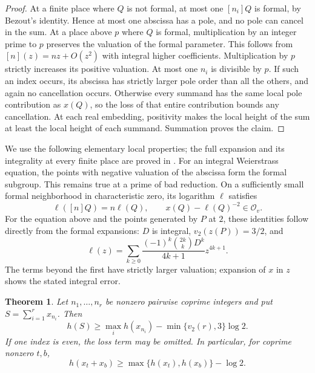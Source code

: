 \documentclass[11pt]{article}
\newtheorem{theorem}{Theorem}[section]
\theoremstyle{remark}\newtheorem{remark}[theorem]{Remark}
\begin{document}
\begin{proof}
At a finite place where $Q$ is not formal, at most one $[n_i]Q$ is
formal, by Bezout's identity.  Hence at most one abscissa has a pole,
and no pole can cancel in the sum.
At a place above $p$ where $Q$ is formal, multiplication by an integer
prime to $p$ preserves the valuation of the formal parameter.  This
follows from $[n](z)=nz+O(z^2)$ with integral higher coefficients.
Multiplication by $p$ strictly increases its positive valuation.
At most one $n_i$ is divisible by $p$.  If such an index occurs, its
abscissa has strictly larger pole order than all the others, and
again no cancellation occurs.  Otherwise every summand has the same
local pole contribution as $x(Q)$, so the loss of that entire
contribution bounds any cancellation.  At each real embedding,
positivity makes the local height of the sum at least the local
height of each summand.  Summation proves the claim.
\end{proof}

We use the following elementary local properties; the full expansion
and its integrality at every finite place are proved in
\cite[Lemma~2]{EffectiveSums}.  For an integral
Weierstrass equation, the points with negative valuation of the
abscissa form the formal subgroup.  This remains true at a prime of bad
reduction.  On a sufficiently small formal neighborhood in characteristic
zero, its logarithm $\ell$ satisfies
\[
\ell([n]Q)=n\ell(Q),\qquad x(Q)-\ell(Q)^{-2}\in\mathcal O_v.
\]
For the equation above and the points generated by $P$ at $2$, these
identities follow directly from the formal expansions: $D$ is integral,
$v_2(z(P))=3/2$, and
\[
\ell(z)=\sum_{k\ge0}
 \frac{(-1)^k\binom{2k}{k}D^k}{4k+1}z^{4k+1}.
\]
The terms beyond the first have strictly larger valuation; expansion
of $x$ in $z$ shows the stated integral error.

\begin{theorem}\label{thm:coprime}
Let $n_1,\ldots,n_r$ be nonzero pairwise coprime integers and put
$S=\sum_{i=1}^r x_{n_i}$.  Then
\begin{equation}\label{eq:height}
h(S)\ge\max_i h(x_{n_i})-\min\{v_2(r),3\}\log2.
\end{equation}
If one index is even, the loss term may be omitted.  In particular,
for coprime nonzero $t,b$,
\[
h(x_t+x_b)\ge\max\{h(x_t),h(x_b)\}-\log2.
\]
\end{theorem}
\end{document}
